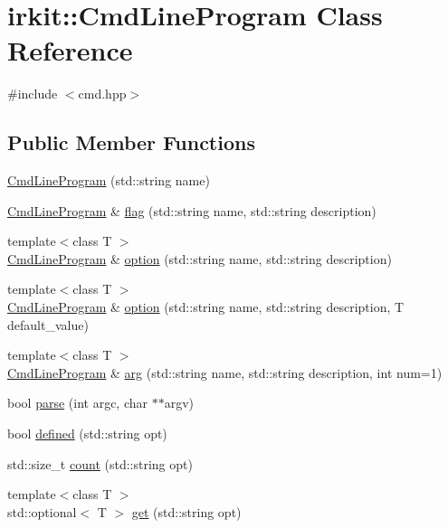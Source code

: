 \hypertarget{classirkit_1_1CmdLineProgram}{}\section{irkit\+:\+:Cmd\+Line\+Program Class Reference}
\label{classirkit_1_1CmdLineProgram}


{\ttfamily \#include $<$cmd.\+hpp$>$}

\subsection*{Public Member Functions}
\begin{DoxyCompactItemize}
\item 
\mbox{\hyperlink{classirkit_1_1CmdLineProgram_a76344c8801faf43d19cdc29d865ec471}{Cmd\+Line\+Program}} (std\+::string name)
\item 
\mbox{\hyperlink{classirkit_1_1CmdLineProgram}{Cmd\+Line\+Program}} \& \mbox{\hyperlink{classirkit_1_1CmdLineProgram_a6c67161afa43d01d508cd4dce263cdda}{flag}} (std\+::string name, std\+::string description)
\item 
{\footnotesize template$<$class T $>$ }\\\mbox{\hyperlink{classirkit_1_1CmdLineProgram}{Cmd\+Line\+Program}} \& \mbox{\hyperlink{classirkit_1_1CmdLineProgram_a2e9f3055f585da847f75d550667a48eb}{option}} (std\+::string name, std\+::string description)
\item 
{\footnotesize template$<$class T $>$ }\\\mbox{\hyperlink{classirkit_1_1CmdLineProgram}{Cmd\+Line\+Program}} \& \mbox{\hyperlink{classirkit_1_1CmdLineProgram_a4df519224335e059f27894b747e3f655}{option}} (std\+::string name, std\+::string description, T default\+\_\+value)
\item 
{\footnotesize template$<$class T $>$ }\\\mbox{\hyperlink{classirkit_1_1CmdLineProgram}{Cmd\+Line\+Program}} \& \mbox{\hyperlink{classirkit_1_1CmdLineProgram_a581bb25b7618eac6e57d94f752391ba1}{arg}} (std\+::string name, std\+::string description, int num=1)
\item 
bool \mbox{\hyperlink{classirkit_1_1CmdLineProgram_aa87697ac96df198f7d9f4775a7a1999f}{parse}} (int argc, char $\ast$$\ast$argv)
\item 
bool \mbox{\hyperlink{classirkit_1_1CmdLineProgram_ab4a436cd7ffe239a8cf4f213f9b0ba62}{defined}} (std\+::string opt)
\item 
std\+::size\+\_\+t \mbox{\hyperlink{classirkit_1_1CmdLineProgram_a05c98944d88fb634a495edeaee0494ac}{count}} (std\+::string opt)
\item 
{\footnotesize template$<$class T $>$ }\\std\+::optional$<$ T $>$ \mbox{\hyperlink{classirkit_1_1CmdLineProgram_a5d08add5193698251c4497c5925cc078}{get}} (std\+::string opt)
\end{DoxyCompactItemize}



